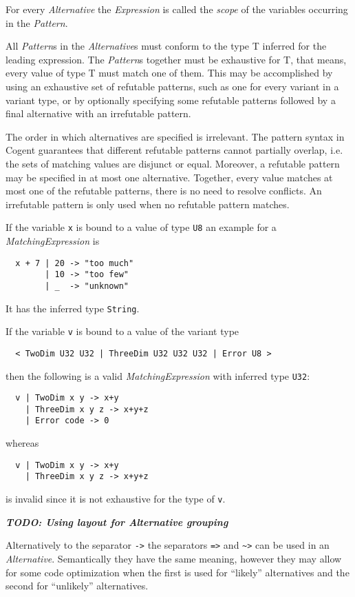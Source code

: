 \documentclass[a4paper]{report}
\newcommand{\code}[1]{\textnormal{\texttt{#1}}}
\newcommand{\cogent}{Cogent\xspace}
\newcommand{\TODO}[1]{\textbf{\textsl{TODO: #1}}}
\newcommand{\todo}[1]{\TODO{#1}}
\begin{document}
For every \textit{Alternative} the \textit{Expression} is called the \textit{scope} of the variables occurring in 
the \textit{Pattern}.

All \textit{Pattern}s in the \textit{Alternative}s must conform to the type T inferred for the leading expression.
The \textit{Pattern}s together must be exhaustive for T, that means, every value of type T must match one of them. This
may be accomplished by using an exhaustive set of refutable patterns, such as one for every variant in a variant type,
or by optionally specifying some refutable patterns followed by a final alternative with an irrefutable pattern.

\cbstart
The order in which alternatives are specified is irrelevant. The pattern syntax in \cogent 
guarantees that different refutable patterns cannot partially overlap, i.e. the sets of matching values
are disjunct or equal. Moreover, a refutable pattern may be specified in at most one alternative. Together,
every value matches at most one of the refutable patterns, there is no need to resolve conflicts.
An irrefutable pattern is only used when no refutable pattern matches.
\cbend

If the variable \code{x} is bound to a value of type \code{U8} an example for a \textit{MatchingExpression} is
\begin{verbatim}
  x + 7 | 20 -> "too much"
        | 10 -> "too few"
        | _  -> "unknown"
\end{verbatim}
It has the inferred type \code{String}.

If the variable \code{v} is bound to a value of the variant type
\cbstart
\begin{verbatim}
  < TwoDim U32 U32 | ThreeDim U32 U32 U32 | Error U8 >
\end{verbatim}
\cbend
then the following is a valid \textit{MatchingExpression} with inferred type \code{U32}:
\cbstart
\begin{verbatim}
  v | TwoDim x y -> x+y
    | ThreeDim x y z -> x+y+z
    | Error code -> 0
\end{verbatim}
\cbend
whereas
\cbstart
\begin{verbatim}
  v | TwoDim x y -> x+y
    | ThreeDim x y z -> x+y+z
\end{verbatim}
\cbend
is invalid since it is not exhaustive for the type of \code{v}.

\todo{Using layout for Alternative grouping}

\cbstart
Alternatively to the separator \code{->} the separators \code{=>} and \code{\~{}>} can be used in an \textit{Alternative}.
Semantically they have the same meaning, however they may allow for some code optimization when the first is used for 
``likely'' alternatives and the second for ``unlikely'' alternatives.
\cbend
\end{document}

